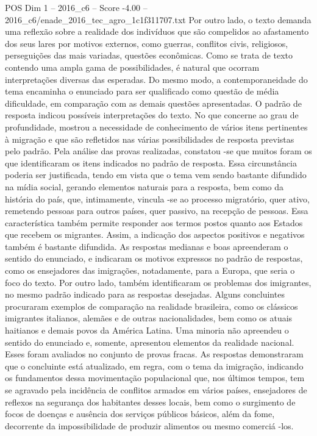 \begin{textsample}{POS Dim 1 – 2016\_c6 – Score -4.00 – 2016\_c6/enade\_2016\_tec\_agro\_1c1f311707.txt}
Por outro lado, o texto demanda uma reflexão sobre a realidade dos indivíduos que são compelidos ao afastamento dos seus lares por motivos externos, como guerras, conflitos civis, religiosos, perseguições das mais variadas, questões econômicas.
Como se trata de texto contendo uma ampla gama de possibilidades, é natural que ocorram interpretações diversas das esperadas.
Do mesmo modo, a contemporaneidade do tema encaminha o enunciado para ser qualificado como questão de média dificuldade, em comparação com as demais questões apresentadas.
O padrão de resposta indicou possíveis interpretações do texto.
No que concerne ao grau de profundidade, mostrou a necessidade de conhecimento de vários itens pertinentes à migração e que são refletidos nas várias possibilidades de resposta previstas pelo padrão.
Pela análise das provas realizadas, constatou -se que muitos foram os que identificaram os itens indicados no padrão de resposta.
Essa circunstância poderia ser justificada, tendo em vista que o tema vem sendo bastante difundido na mídia social, gerando elementos naturais para a resposta, bem como da história do país, que, intimamente, vincula -se ao processo migratório, quer ativo, remetendo pessoas para outros países, quer passivo, na recepção de pessoas.
Essa característica também permite responder aos termos postos quanto aos Estados que recebem os migrantes.
Assim, a indicação dos aspectos positivos e negativos também é bastante difundida.
As respostas medianas e boas apreenderam o sentido do enunciado, e indicaram os motivos expressos no padrão de respostas, como os ensejadores das imigrações, notadamente, para a Europa, que seria o foco do texto.
Por outro lado, também identificaram os problemas dos imigrantes, no mesmo padrão indicado para as respostas desejadas.
Alguns concluintes procuraram exemplos de comparação na realidade brasileira, como os clássicos imigrantes italianos, alemães e de outras nacionalidades, bem como os atuais haitianos e demais povos da América Latina.
Uma minoria não apreendeu o sentido do enunciado e, somente, apresentou elementos da realidade nacional.
Esses foram avaliados no conjunto de provas fracas.
As respostas demonstraram que o concluinte está atualizado, em regra, com o tema da imigração, indicando os fundamentos dessa movimentação populacional que, nos últimos tempos, tem se agravado pela incidência de conflitos armados em vários países, ensejadores de reflexos na segurança dos habitantes desses locais, bem como o surgimento de focos de doenças e ausência dos serviços públicos básicos, além da fome, decorrente da impossibilidade de produzir alimentos ou mesmo comerciá -los.

\end{textsample}
